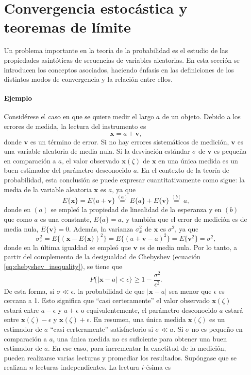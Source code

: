 \documentclass[a4paper]{report}
\newcommand{\x}{\mathbf{x}}
\begin{document}
\section{Convergencia estocástica y teoremas de límite}

Un problema importante en la teoría de la probabilidad es el estudio de las propiedades asintóticas de secuencias de variables aleatorias. En esta sección se introducen los conceptos asociados, haciendo énfasis en las definiciones de los distintos modos de convergencia y la relación entre ellos.

\paragraph{Ejemplo} Considérese el caso en que se quiere medir el largo \(a\) de un objeto. Debido a los errores de medida, la lectura del instrumento es
\[
 \x=a+\mathbf{v},
\]
donde \(\mathbf{v}\) es un término de error. Si no hay errores sistemáticos de medición, \(\mathbf{v}\) es una variable aleatoria de media nula. Si la desviación estándar \(\sigma\) de \(\mathbf{v}\) es pequeña en comparación a \(a\), el valor observado \(\x(\zeta)\) de \(\x\) en una única medida es un buen estimador del parámetro desconocido \(a\).
En el contexto de la teoría de probabilidad, esta conclusión se puede expresar cuantitativamente como sigue: la media de la variable aleatoria \(\x\) es \(a\), ya que
\[
 E\{\x\}=E\{a+\mathbf{v}\}\overset{(a)}{=}E\{a\}+E\{\mathbf{v}\}\overset{(b)}{=}a,
\]
donde en \((a)\) se empleó la propiedad de linealidad de la esperanza y en \((b)\) que como \(a\) es una constante, \(E\{a\}=a\), y también que el error de medición es de media nula, \(E\{\mathbf{v}\}=0\). Además, la varianza \(\sigma^2_x\) de \(\x\) es \(\sigma^2\), ya que
\[
 \sigma^2_x=E\{(\x-E\{\x\})^2\}=E\{(a+\mathbf{v}-a)^2\}=E\{\mathbf{v}^2\}=\sigma^2,
\]
donde en la última igualdad se empleó que \(\mathbf{v}\) es de media nula. Por lo tanto, a partir del complemento de la desigualdad de Chebyshev (ecuación \ref{eq:chebyshev_inequality}), se tiene que
\[
 P\{|\x-a|<\epsilon\}\geq 1-\frac{\sigma^2}{\epsilon^2}.
\]
De esta forma, si \(\sigma\ll\epsilon\), la probabilidad de que \(|\x-a|\) sea menor que \(\epsilon\) es cercana a 1. Esto significa que ``casi certeramente'' el valor observado \(\x(\zeta)\) estará entre \(a-\epsilon\) y \(a+\epsilon\) o equivalentemente, el parámetro desconocido \(a\) estará entre \(\x(\zeta)-\epsilon\) y \(\x(\zeta)+\epsilon\). En resumen, una única medida \(\x(\zeta)\) es un estimador de \(a\) ``casi certeramente'' satisfactorio si \(\sigma\ll a\). Si \(\sigma\) no es pequeño en comparación a \(a\), una única medida no es suficiente para obtener una buen estimador de \(a\). En ese caso, para incrementar la exactitud de la medición, pueden realizarse varias lecturas y promediar los resultados. Supóngase que se realizan \(n\) lecturas independientes. La lectura  \(i\)-ésima es
\end{document}
